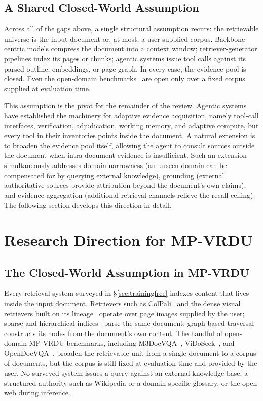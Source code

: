 \documentclass[11pt]{article}
\begin{document}
\subsection{A Shared Closed-World Assumption}
Across all of the gaps above, a single structural assumption recurs: the retrievable universe is the input document or, at most, a user-supplied corpus. Backbone-centric models compress the document into a context window; retriever-generator pipelines index its pages or chunks; agentic systems issue tool calls against its parsed outline, embeddings, or page graph. In every case, the evidence pool is closed. Even the open-domain benchmarks~\cite{cho2025m3docvqa,wang2025vidorag,tanaka2025vdocrag} are open only over a fixed corpus supplied at evaluation time.

This assumption is the pivot for the remainder of the review. Agentic systems have established the machinery for adaptive evidence acquisition, namely tool-call interfaces, verification, adjudication, working memory, and adaptive compute, but every tool in their inventories points inside the document. A natural extension is to broaden the evidence pool itself, allowing the agent to consult sources outside the document when intra-document evidence is insufficient. Such an extension simultaneously addresses domain narrowness (an unseen domain can be compensated for by querying external knowledge), grounding (external authoritative sources provide attribution beyond the document's own claims), and evidence aggregation (additional retrieval channels relieve the recall ceiling). The following section develops this direction in detail.

\section{Research Direction for MP-VRDU}
\label{sec:external}

\subsection{The Closed-World Assumption in MP-VRDU}
Every retrieval system surveyed in \S\ref{sec:trainingfree} indexes content that lives inside the input document. Retrievers such as ColPali~\cite{faysse2024colpali} and the dense visual retrievers built on its lineage~\cite{cho2024m3docrag,tanaka2025vdocrag} operate over page images supplied by the user; sparse and hierarchical indices~\cite{shin2025multidocfusion,gong2025mhier} parse the same document; graph-based traversal~\cite{wang2024knowledge,wu2025molorag,zhang2026mldocrag} constructs its nodes from the document's own content. The handful of open-domain MP-VRDU benchmarks, including M3DocVQA~\cite{cho2025m3docvqa}, ViDoSeek~\cite{wang2025vidorag}, and OpenDocVQA~\cite{tanaka2025vdocrag}, broaden the retrievable unit from a single document to a corpus of documents, but the corpus is still fixed at evaluation time and provided by the user. No surveyed system issues a query against an external knowledge base, a structured authority such as Wikipedia or a domain-specific glossary, or the open web during inference.
\end{document}
